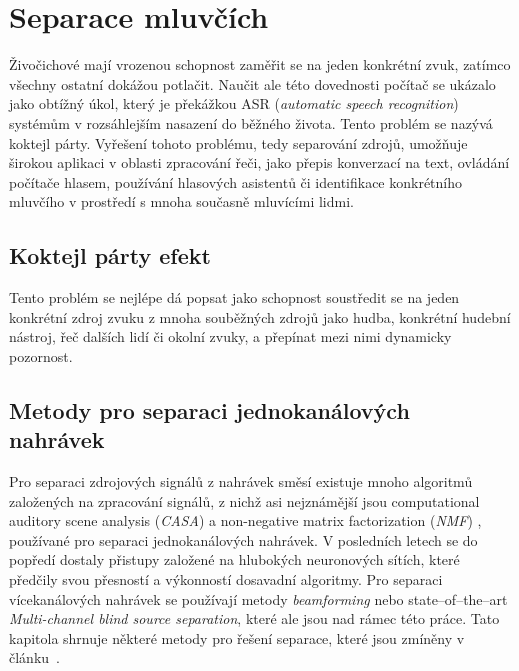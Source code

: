 \chapter{Separace mluvčích}
\label{separace}
Živočichové mají vrozenou schopnost zaměřit se na jeden konkrétní zvuk, zatímco všechny ostatní dokážou potlačit. Naučit ale této dovednosti počítač se ukázalo jako obtížný úkol, který je překážkou ASR (\textit{automatic speech recognition}) systémům v rozsáhlejším nasazení do běžného života. Tento problém se nazývá koktejl párty. Vyřešení tohoto problému, tedy separování zdrojů, umožňuje širokou aplikaci v oblasti zpracování řeči, jako  přepis konverzací na text, ovládání počítače hlasem, používání hlasových asistentů či identifikace konkrétního mluvčího v prostředí s mnoha současně mluvícími lidmi.

\section{Koktejl párty efekt}
Tento problém se nejlépe dá popsat jako schopnost soustředit se na jeden konkrétní zdroj zvuku z mnoha souběžných zdrojů jako hudba, konkrétní hudební nástroj, řeč dalších lidí či okolní zvuky, a přepínat mezi nimi dynamicky pozornost. 



\section{Metody pro separaci jednokanálových nahrávek}
Pro separaci zdrojových signálů z nahrávek směsí existuje mnoho algoritmů založených na zpracování signálů, z nichž asi nejznámější jsou computational auditory scene analysis (\textit{CASA}) a non-negative matrix factorization (\textit{NMF}) , používané pro separaci jednokanálových nahrávek. V posledních letech se do popředí dostaly přistupy založené na hlubokých neuronových sítích, které předčily svou přesností a výkonností dosavadní algoritmy. Pro separaci vícekanálových nahrávek se používají metody \textit{beamforming} nebo state--of--the--art \textit{Multi-channel blind source separation}, které ale jsou nad rámec této práce. Tato kapitola shrnuje některé metody pro řešení separace, které jsou zmíněny v článku~\cite{speechseparation}.


